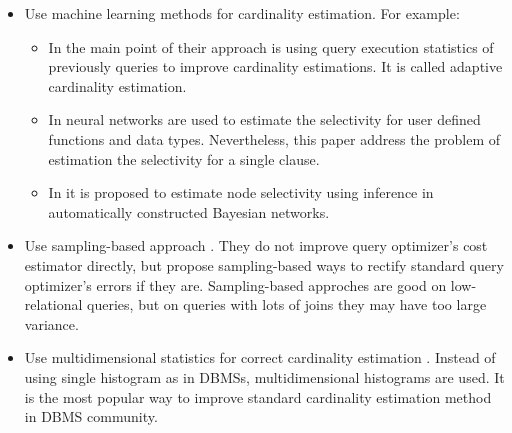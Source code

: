 \begin{itemize}
	\item Use machine learning methods for cardinality estimation. For example:
	\begin{itemize}
		\item In \cite{adaptive cardinality estimation} the main point of their approach is 				using query execution statistics of previously queries to improve cardinality 					estimations. It is called adaptive cardinality estimation.
		\item In \cite{neural network approach} neural networks are used to estimate the 					selectivity for user defined functions and data types. Nevertheless, this paper 				address the problem of estimation the selectivity for a single clause.
		\item In \cite{probabilistic models} it is proposed to estimate node selectivity 					using inference in automatically constructed Bayesian networks. 
	\end{itemize}
	\item Use sampling-based approach \cite{sampling-based,cost models are unusable}. They 				do not improve query optimizer's cost estimator directly, but propose sampling-based 		ways to rectify standard query optimizer's errors if they are. Sampling-based 					approches are good on low-relational queries, but on queries with lots of joins they 		may have too large variance.
	\item Use multidimensional statistics for correct cardinality estimation \cite{A 					multidimensional workload-aware histogram,multidimensional range queries}. Instead 				of using single histogram as in DBMSs, multidimensional histograms are used. It is 				the most popular way to improve standard cardinality estimation method in DBMS 					community.
\end{itemize}

